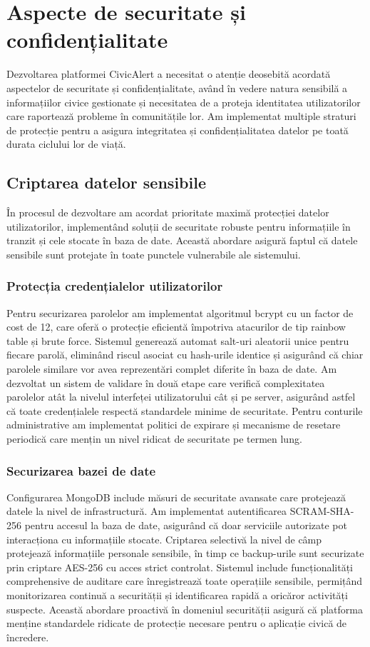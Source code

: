 \documentclass[12pt,a4paper]{report}
\begin{document}
\section{Aspecte de securitate și confidențialitate}
Dezvoltarea platformei CivicAlert a necesitat o atenție deosebită acordată aspectelor de securitate și confidențialitate, având în vedere natura sensibilă a informațiilor civice gestionate și necesitatea de a proteja identitatea utilizatorilor care raportează probleme în comunitățile lor. Am implementat multiple straturi de protecție pentru a asigura integritatea și confidențialitatea datelor pe toată durata ciclului lor de viață.
\subsection{Criptarea datelor sensibile}
În procesul de dezvoltare am acordat prioritate maximă protecției datelor utilizatorilor, implementând soluții de securitate robuste pentru informațiile în tranzit și cele stocate în baza de date. Această abordare  asigură faptul că datele sensibile sunt protejate în toate punctele vulnerabile ale sistemului.
\subsubsection{Protecția credențialelor utilizatorilor}
Pentru securizarea parolelor am implementat algoritmul bcrypt cu un factor de cost de 12, care oferă o protecție eficientă împotriva atacurilor de tip rainbow table și brute force. Sistemul generează automat salt-uri aleatorii unice pentru fiecare parolă, eliminând riscul asociat cu hash-urile identice și asigurând că chiar parolele similare vor avea reprezentări complet diferite în baza de date.
Am dezvoltat un sistem de validare în două etape care verifică complexitatea parolelor atât la nivelul interfeței utilizatorului cât și pe server, asigurând astfel că toate credențialele respectă standardele minime de securitate. Pentru conturile administrative am implementat politici de expirare și mecanisme de resetare periodică care mențin un nivel ridicat de securitate pe termen lung.
\subsubsection{Securizarea bazei de date}
Configurarea MongoDB include măsuri de securitate avansate care protejează datele la nivel de infrastructură. Am implementat autentificarea SCRAM-SHA-256 pentru accesul la baza de date, asigurând că doar serviciile autorizate pot interacționa cu informațiile stocate. Criptarea selectivă la nivel de câmp protejează informațiile personale sensibile, în timp ce backup-urile sunt securizate prin criptare AES-256 cu acces strict controlat.
Sistemul include funcționalități comprehensive de auditare care înregistrează toate operațiile sensibile, permițând monitorizarea continuă a securității și identificarea rapidă a oricăror activități suspecte. Această abordare proactivă în domeniul securității asigură că platforma menține standardele ridicate de protecție necesare pentru o aplicație civică de încredere.
\end{document}
